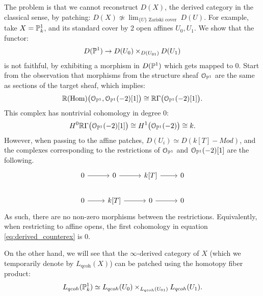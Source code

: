 \documentclass[10pt,a4paper,reqno,oneside]{book} %
\theoremstyle{plain}
\theoremstyle{definition}
\theoremstyle{remark}
\numberwithin{equation}{section}
\begin{document}
\begin{enumerate}
The problem is that we cannot reconstruct $D(X)$, the derived category in the classical sense, by patching: $D(X) \not \simeq 
\lim_{\{U\} \text{ Zariski cover }} D(U)$. For example, take $X = \mathbb P^1_k$, and its standard cover by 2 open affines $U_0, U_1$.
We show that the functor:
\[	D(\mathbb P^1) \to D(U_0) \times_{D(U_{01})} D(U_1)	\]
is not faithful, by exhibiting a morphism in $D(\mathbb P^1)$ which gets mapped to 0. Start from the observation that morphisms
from the structure sheaf $\mathcal{O}_{\mathbb P^1}$ are the same as sections of the target sheaf, which implies:
\[	\mathbb R(\operatorname{Hom}) \big(\mathcal{O}_{\mathbb P^1},\mathcal{O}_{\mathbb P^1}(-2)[1]\big) \cong \mathbb R \Gamma\big(\mathcal{O}_{\mathbb P^1}(-2)[1]\big) .	\]
This complex has nontrivial cohomology in degree 0:
\begin{equation}
\label{eq:derived_counterex}
	H^0 \mathbb R \Gamma\big(\mathcal{O}_{\mathbb P^1}(-2)[1]\big) \cong H^1\big(\mathcal{O}_{\mathbb P^1}(-2)\big) \cong k.
\end{equation}
However, when passing to the affine patches, $D(U_i) \simeq D(k[T]-Mod)$, and the complexes corresponding to the
restrictions of $\mathcal{O}_{\mathbb P^1}$ and $\mathcal{O}_{\mathbb P^1}(-2)[1]$ are the following.
\[
\begin{tikzcd}
0\arrow{r} & 0\arrow{r} & k[T]\arrow{r} & 0 \\
0\arrow{r} & k[T]\arrow{r} & 0\arrow{r} & 0
\end{tikzcd}
\]
As such, there are no non-zero morphisms between the restrictions. Equivalently, when restricting to affine opens,
the first cohomology in equation \ref{eq:derived_counterex} is 0.

On the other hand, we will see that the $\infty$-derived category of $X$ (which we temporarily 
denote by $L_{\text{qcoh}}(X)$) can be patched using the homotopy fiber product:
\[	L_{qcoh}(\mathbb P^1_k) \simeq  L_{qcoh}(U_0) \times_{L_{qcoh}(U_{01})} L_{qcoh}(U_1) .\]


\end{enumerate}
\end{document}
